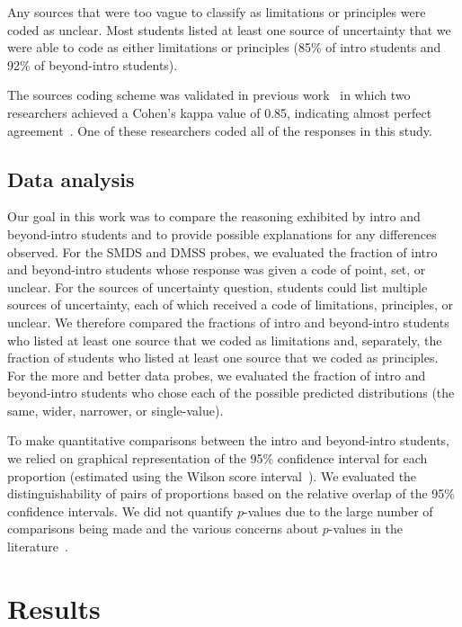\documentclass[english,aps,prstper,reprint,showpacs,longbibliography,superscriptaddress,nofootinbib]{revtex4-2}
\begin{document}
Any sources that were too vague to classify as limitations or principles were coded as unclear. Most students listed at least one source of uncertainty that we were able to code as either limitations or principles (85\% of intro students and 92\% of beyond-intro students).

The sources coding scheme was validated in previous work~\cite{StumpTBD} in which two researchers achieved a Cohen's kappa value of 0.85, indicating almost perfect agreement~\cite{Landis1977}. One of these researchers coded all of the responses in this study.


\subsection{Data analysis}

Our goal in this work was to compare the reasoning exhibited by intro and beyond-intro students and to provide possible explanations for any differences observed. For the SMDS and DMSS probes, we evaluated the fraction of intro and beyond-intro students whose response was given a code of point, set, or unclear. For the sources of uncertainty question, students could list multiple sources of uncertainty, each of which received a code of limitations, principles, or unclear. We therefore compared the fractions of intro and beyond-intro students who listed at least one source that we coded as limitations and, separately, the fraction of students who listed at least one source that we coded as principles. For the more and better data probes, we evaluated the fraction of intro and beyond-intro students who chose each of the possible predicted distributions (the same, wider, narrower, or single-value).

To make quantitative comparisons between the intro and beyond-intro students, we relied on graphical representation of the 95\% confidence interval for each proportion (estimated using the Wilson score interval~\cite{Wilson1927}). We evaluated the distinguishability of pairs of proportions based on the relative overlap of the 95\% confidence intervals. We did not quantify $p$-values due to the large number of comparisons being made and the various concerns about $p$-values in the literature~\cite[e.g.][]{cohen_earth_1994, cumming_new_2013, nosek_preregistration_2018}. 

\section{Results}
\end{document}
